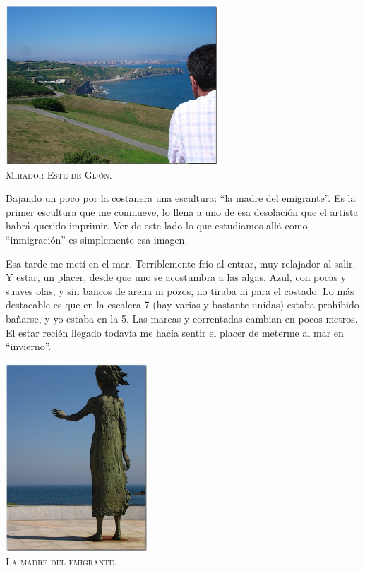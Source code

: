 \begin{center} \includegraphics[width=300px]{images/Espana-805.JPG}\\
\textsc{Mirador Este de Gij\'on.} \end{center}

Bajando un poco por la costanera una escultura: ``la madre del emigrante''. Es
la primer escultura que me conmueve, lo llena a uno de esa desolaci\'on que el
artista habr\'a querido imprimir. Ver de este lado lo que estudiamos all\'a
como ``inmigraci\'on'' es simplemente esa imagen.

Esa tarde me met\'i en el mar. Terriblemente fr\'io al entrar, muy relajador
al salir. Y estar, un placer, desde que uno se acostumbra a las algas. Azul,
con pocas y suaves olas, y sin bancos de arena ni pozos, no tiraba ni para el
costado. Lo m\'as destacable es que en la escalera 7 (hay varias y bastante
unidas) estaba prohibido ba\~narse, y yo estaba en la 5. Las mareas y
correntadas cambian en pocos metros. El estar reci\'en llegado todav\'ia me
hac\'ia sentir el placer de meterme al mar en ``invierno''.

\begin{center}
  \includegraphics[width=200px]{images/Espana-812.JPG}\\
  \textsc{La madre del emigrante.}
\end{center}

